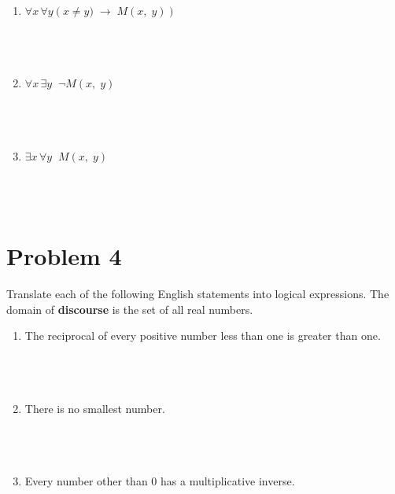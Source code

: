 \documentclass{amsart}
\theoremstyle{definition}
\theoremstyle{Exercise}
\theoremstyle{remark}
\theoremstyle{rule}
\numberwithin{equation}{section}
\begin{document}
\begin{enumerate}[label=(\alph*)]

\item $\forall x \, \forall y \left(x\not= y)\;\to \;  M(x,\;y)\right)$\\\\
\\\\

\item $\forall x \, \exists y \;\; \neg M(x,\;y)$\\\\
\\\\
\item $\exists x \, \forall y \;\; M(x,\;y)$\\\\
\\\\
\end{enumerate}

\newpage


\section*{Problem 4}

Translate each of the following English statements into logical expressions. The domain of {\bf discourse} is the set of all real numbers.\\
\begin{enumerate}[label=(\alph*)]

\item The reciprocal of every positive number less than one is greater than one.\\\\
\\\\
\item There is no smallest number.\\\\
\\\\

\item Every number other than 0 has a multiplicative inverse.\\\\
\\\\
\end{enumerate}
\end{document}
